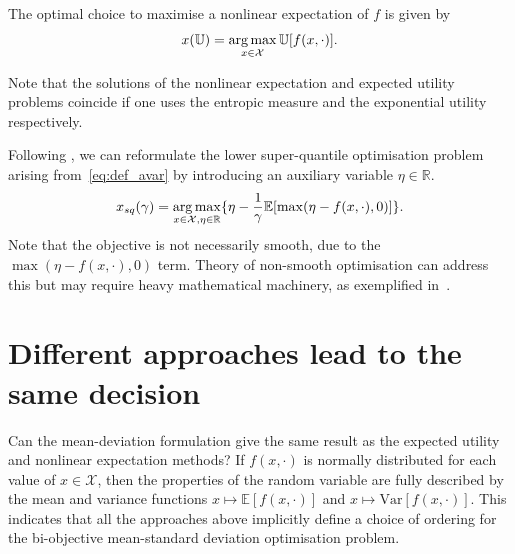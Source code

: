 \documentclass[main.tex]{subfiles}
\begin{document}
\begin{problem}
  The optimal choice to maximise a nonlinear expectation
  of $f$ is given by
  \begin{align}
    x(\mathbb{U})=\operatorname*{arg\,max}_{x\in\mathcal{X}} \mathbb{U}[f(x,\cdot)].
  \end{align}
\end{problem}

Note that the solutions of the nonlinear expectation and expected
utility problems coincide if one uses the entropic measure and the exponential
utility respectively.
\begin{example}
  Following \citep{ben2007old}, we can reformulate the lower
  super-quantile optimisation problem arising from~\eqref{eq:def_avar}
  by introducing an auxiliary variable $\eta\in\mathbb{R}$.
  \begin{equation}\label{eq:opt_avar}
    x_{sq}({\gamma})
    =\operatorname*{arg\,max}_{x\in\mathcal{X},\eta\in\mathbb{R}}
    \{\eta - \frac{1}{\gamma}\mathbb{E}[\max(\eta-f(x,\cdot),0)]\}.
  \end{equation}
  Note that the objective is not necessarily smooth, due to the
  $\max(\eta-f(x,\cdot),0)$ term. Theory of non-smooth optimisation
  can address this but may require heavy mathematical machinery, as
  exemplified in~\cite{kouri2016risk}.
\end{example}


\section{Different approaches lead to the same decision}\label{sec:one_comparison_orderings}
Can the mean-deviation formulation give the
same result as the expected utility and nonlinear expectation methods?
If $f(x,\cdot)$ is normally distributed for each value of
$x\in\mathcal{X}$, then the properties of the random variable are fully
described by the mean and variance functions $x\mapsto
\mathbb{E}[f(x,\cdot)]$ and $x\mapsto \mbox{Var}[f(x,\cdot)]$. This
indicates that all the approaches above implicitly define a
choice of ordering for the bi-objective mean-standard deviation
optimisation problem.
\end{document}
